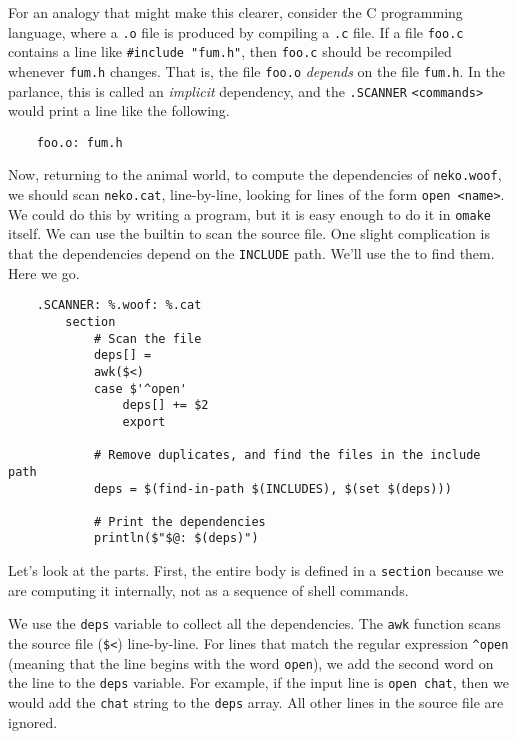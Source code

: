 For an analogy that might make this clearer, consider the C programming language, where a \verb+.o+
file is produced by compiling a \verb+.c+ file.  If a file \verb+foo.c+ contains a line like
\verb+#include "fum.h"+, then \verb+foo.c+ should be recompiled whenever \verb+fum.h+ changes.  That
is, the file \verb+foo.o+ \emph{depends} on the file \verb+fum.h+.  In the \OMake{} parlance, this is
called an \emph{implicit} dependency, and the \verb+.SCANNER+ \verb+<commands>+ would print a line
like the following.

\begin{verbatim}
    foo.o: fum.h
\end{verbatim}

 Now, returning to the animal world, to compute the dependencies of \verb+neko.woof+, we
should scan \verb+neko.cat+, line-by-line, looking for lines of the form \verb+open <name>+.  We
could do this by writing a program, but it is easy enough to do it in \verb+omake+ itself.  We can
use the builtin  to scan the source file.  One slight complication
is that the dependencies depend on the \verb+INCLUDE+ path.  We'll use the
 to find them.  Here we go.

\begin{verbatim}
    .SCANNER: %.woof: %.cat
        section
            # Scan the file
            deps[] =
            awk($<)
            case $'^open'
                deps[] += $2
                export

            # Remove duplicates, and find the files in the include path
            deps = $(find-in-path $(INCLUDES), $(set $(deps)))

            # Print the dependencies
            println($"$@: $(deps)")
\end{verbatim}

Let's look at the parts.  First, the entire body is defined in a \verb+section+ because we are
computing it internally, not as a sequence of shell commands.

We use the \verb+deps+ variable to collect all the dependencies.  The \verb+awk+ function scans the
source file (\verb+$<+) line-by-line.  For lines that match the regular expression \verb+^open+
(meaning that the line begins with the word \verb+open+), we add the second word on the line to the
\verb+deps+ variable.  For example, if the input line is \verb+open chat+, then we would add the
\verb+chat+ string to the \verb+deps+ array.  All other lines in the source file are ignored.

